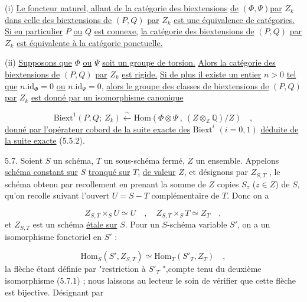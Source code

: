 (i) \underline{Le foncteur naturel, allant de la catégorie des biextensions}
\underline{de} $(\Phi,\Psi)$\underline{par} $Z_k$ \underline{dans celle des biextensions de} $(P,Q)$ \underline{par} $Z_k$ \underline{est une équivalence de catégories. Si en particulier} $P$ \underline{ou} $Q$ \underline{est connexe,} \underline{la catégorie des biextensions de} $(P,Q)$ \underline{par} $Z_k$ \underline{est équivalente à la catégorie ponctuelle.}

(ii) \underline{Supposons que} $\Phi$ \underline{ou} $\Psi$ \underline{soit un groupe de torsion.} \underline{Alors la catégorie des biextensions de} $(P,Q)$ \underline{par} $Z_k$ \underline{est rigide.} \underline{Si de plus il existe un entier} $n > 0$ \underline{tel que} $n.\mathrm{id}_{\Phi} = 0$ \underline{ou} $n.\mathrm{id}_{\Psi} = 0$, \underline{alors le groupe des classes de biextensions de} $(P,Q)$ \underline{par} $Z_k$ \underline{est donné par un isomorphisme canonique}

\begin{equation}\tag{5.6.1}
\mathrm{Biext}^1(P,Q;\ Z_k) \xleftarrow{\ \sim\ } \mathrm{Hom}(\Phi \otimes \Psi\ ,\ (Z \otimes_{\mathbb{Z}} \mathbb{Q})/Z) \quad ,
\end{equation}
\underline{donné par l'opérateur cobord de la suite exacte des} $\mathrm{Biext}^i$ $(i=0,1)$ \underline{déduite de la suite exacte} (5.5.2).

5.7. Soient $S$ un schéma, $T$ un sous-schéma fermé, $Z$ un ensemble. Appelons \underline{schéma constant sur} $S$ \underline{tronqué sur} $T$, \underline{de valeur} $Z$, et désignons par $Z_{S,T}$ , le schéma obtenu par recollement en prenant la somme de $Z$ copies $S_z$ ($z \in Z$) de $S$, qu'on recolle suivant l'ouvert $U = S-T$ complémentaire de $T$. Donc on a

\begin{equation}\tag{5.7.1}
Z_{S,T} \times_S U \simeq U \quad , \quad Z_{S,T} \times_S T \simeq Z_T \quad ,
\end{equation}
et $Z_{S,T}$ est un schéma \underline{étale sur} $S$. Pour un $S$-schéma variable $S'$, on a un isomorphisme fonctoriel en $S'$ :

\begin{equation}\tag{5.7.2}
\mathrm{Hom}_S(S',Z_{S,T}) \simeq \mathrm{Hom}_T(S'_T,Z_T) \quad ,
\end{equation}
la flèche étant définie par "restriction à $S'_T$ ",compte tenu du deuxième isomorphisme (5.7.1) ; nous laissons au lecteur le soin de vérifier que cette flèche est bijective. Désignant par 


